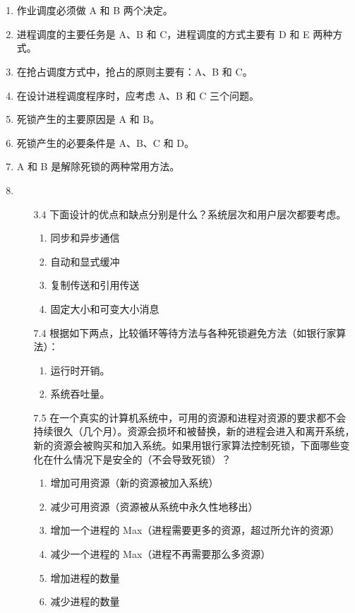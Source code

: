 \documentclass[UTF8]{ctexart}
\begin{document}
\section{}
\begin{enumerate}
	\item 作业调度必须做 A 和 B 两个决定。
	
	\item 进程调度的主要任务是 A、B 和 C，进程调度的方式主要有 D 和 E 两种方式。
	
	\item 在抢占调度方式中，抢占的原则主要有：A、B 和 C。
	
	\item 在设计进程调度程序时，应考虑 A、B 和 C 三个问题。
	
	\item 死锁产生的主要原因是 A 和 B。
	
	\item 死锁产生的必要条件是 A、B、C 和 D。
	
	\item A 和 B 是解除死锁的两种常用方法。
	
	\item \begin{enumerate}
		\item[3.4] 下面设计的优点和缺点分别是什么？系统层次和用户层次都要考虑。
		\begin{enumerate}
			\item 同步和异步通信
			\item 自动和显式缓冲
			\item 复制传送和引用传送
			\item 固定大小和可变大小消息
		\end{enumerate}

		\item[7.4] 根据如下两点，比较循环等待方法与各种死锁避免方法（如银行家算法）：
		\begin{enumerate}
			\item 运行时开销。
			\item 系统吞吐量。
		\end{enumerate}
		
		\item[7.5] 在一个真实的计算机系统中，可用的资源和进程对资源的要求都不会持续很久（几个月）。资源会损坏和被替换，新的进程会进入和离开系统，新的资源会被购买和加入系统。如果用银行家算法控制死锁，下面哪些变化在什么情况下是安全的（不会导致死锁）？
		\begin{enumerate}
			\item 增加可用资源（新的资源被加入系统）
			\item 减少可用资源（资源被从系统中永久性地移出）
			\item 增加一个进程的 Max（进程需要更多的资源，超过所允许的资源）
			\item 减少一个进程的 Max（进程不再需要那么多资源）
			\item 增加进程的数量
			\item 减少进程的数量
		\end{enumerate}
		

\end{enumerate}
\end{enumerate}
\end{document}
